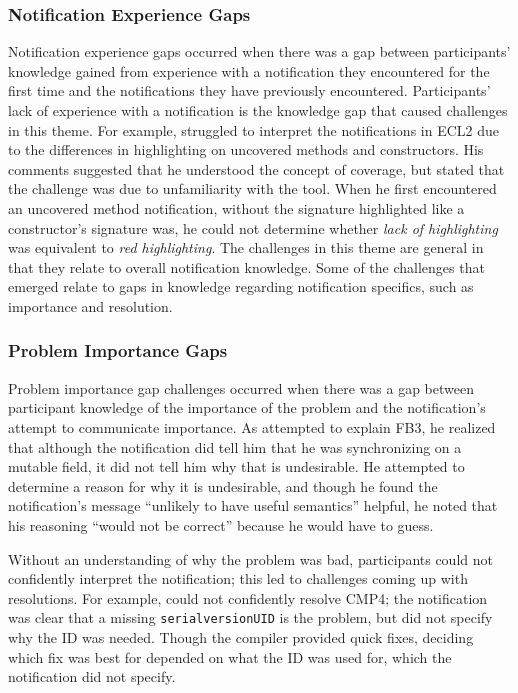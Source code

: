 \subsubsection{Notification Experience Gaps}\label{subsec:notif}
Notification experience gaps occurred when there was a gap between participants' knowledge gained 
from experience with a notification they encountered for the first time and the notifications they have previously encountered. 
Participants' lack of experience with a notification is the knowledge gap that caused challenges in this theme.
For example,  struggled to interpret the notifications in ECL2 due to the differences in highlighting on uncovered methods and constructors.  His comments suggested that he understood the concept of coverage, but stated that the challenge was due to unfamiliarity with the tool.
When he first encountered an uncovered method notification, without the signature highlighted like a constructor's signature was, he could not determine whether \emph{lack of highlighting} was equivalent to \emph{red highlighting}.
The challenges in this theme are general in that they relate to overall notification knowledge. Some of the challenges that emerged relate to gaps in knowledge regarding notification specifics, such as importance and resolution. 

\subsubsection{Problem Importance Gaps}\label{subsec:rationale}
Problem importance gap challenges occurred when there was a gap between participant knowledge of the importance of the problem and the notification's attempt to communicate importance.
As  attempted to explain FB3, he realized that although the notification did tell him that he was synchronizing on a mutable field, it did not tell him why that is undesirable. 
He attempted to determine a reason for why it is undesirable, and though he found the notification's message ``unlikely to have useful semantics'' helpful, he noted that his reasoning ``would not be correct'' because he would have to guess.

Without an understanding of why the problem was bad, participants could not confidently interpret the notification; this led to challenges coming up with resolutions. 
For example,  could not confidently resolve CMP4; the notification was clear that a missing \texttt{serialversionUID} is the problem, but did not specify why the ID was needed. 
Though the compiler provided quick fixes, deciding which fix was best for  depended on what the ID was used for, which the notification did not specify.

